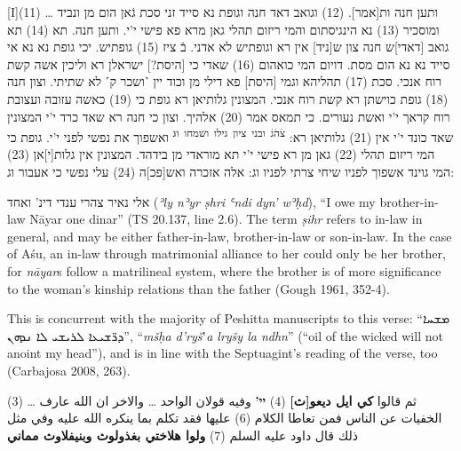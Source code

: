 \documentclass[
  english,
  a4paper,
  DIV=12,
  footlines=2.1,
  usegeometry=true]{scrartcl}
\newcommand{\texthebrew}[2][]{\foreignlanguage{hebrew}{#2}}
\newenvironment{hebrew}[2][]{\begin{otherlanguage}{hebrew}}{\end{otherlanguage}}
\newcommand{\textenglish}[2][]{\foreignlanguage{english}{#2}}
\newcommand{\textsyriac}[2][]{\foreignlanguage{syriac}{#2}}
\begin{document}
\begin{hebrew}

\leavevmode\marginpar{\textcolor{parnum}{{[}1{]}}}\textenglish{{[}I{]}}(11)
\ldots{} ותען חנה ות{[}אמר{]}. (12) וגואב דאד חנה וגופת נא סייד זני סכת
ג͘אן הום מן ונביד ומוסכיר (13) נא הינגיסתום והמי ריזום תהלי גאן מרא פא
פישי י'י. ותען חנה. תא (14) תא גואב {[}דאדי{]}ש חנה צון ש{[}ניד{]} אין
רא וגופתיש לא אדני. בֿ ציז (15) גופתיש. יכי גופת נא נא אי סייד נא נא הום
מסת. דויום המי כואהום (16) שאדי כי {[}היסת?{]} ישראלן רא וליכין אשה קשת
רוח אנכי. סכת (17) תהליהא וגמי {[}היסת{]} פא דילי מן וכוד יין ˺ושכר ק˹
לא שתיתי. וצון חנה (18) גופת כוישתן רא קשת רוח אנכי. המצונין גלותיאן רא
גופת כי (19) כאשה עזובה ועצובת רוח קראך י'י ואשת נעורים. כי תמאס אמר
(20) אלהיך. וצון כי חנה רא שאד כרד י'י המצונין שאד כונד י'י אין (21)
גלותיאן רא: \textsuperscript{צ͘ה͘ג͘~ובני~ציון~גילו~ושמחו~וג}͘ ואשפוך את
נפשי לפני י'י. גופת כי המי ריזום תהלי (22) גאן מן רא פישי י'י תא מוראדי
מן בידהד. המצונין אין גלות{[}י{]}אן (23) המי גוינד אשפוך לפניו שיחי צרתי
לפניו וג: אלה אזכרה ואש{[}פכ{]}ה (24) עלי נפשי כי אעבור וג:

\end{hebrew}

\leavevmode\marginpar{\textcolor{parnum}{{[}2{]}}}\texthebrew{אלי נאיר
צהרי ענדי דינ' ואחד} (\emph{ʾly nʾyr ṣhri ʿndi dyn' wʾḥd}), ``I owe my
brother-in-law Nāyar one dinar'' (TS 20.137, line 2.6). The term
\emph{ṣihr} refers to in-law in general, and may be either
father-in-law, brother-in-law or son-in-law. In the case of Aśu, an
in-law through matrimonial alliance to her could only be her brother,
for \emph{nāyar}s follow a matrilineal system, where the brother is of
more significance to the woman's kinship relations than the father
(Gough 1961, 352-4).

\leavevmode\marginpar{\textcolor{parnum}{{[}3{]}}}This is concurrent
with the majority of Peshitta manuscripts to this verse:
``\textsyriac{ܡܫܚܐ ܕܪ̈ܫܝܥܐ ܠܪܝܫܝ ܠܐ ܢܕܗܢ}'', ``\emph{mšḥa d'ryš}‛\emph{a
lryšy la ndhn}'' (``oil of the wicked will not anoint my head''), and is
in line with the Septuagint's reading of the verse, too (Carbajosa 2008,
263).

\begin{Arabic}

\leavevmode\marginpar{\textcolor{parnum}{{[}4{]}}}(3) \ldots{} ثم قالوا
\textbf{كي ايل ديعو{[}ث{]}} (4) \textbf{יי'} وفيه قولان الواحد \ldots{}
والاخر ان الله عارف الخفيات عن الناس فمن تعاطا الكلام (6) عليها فقد تكلم
بما ينكره الله عليه وفي مثل ذلك قال داود عليه السلم (7) \textbf{ولوا
هلاختي بغذولوث وبنيفلاوث مماني}

\end{Arabic}
\end{document}
